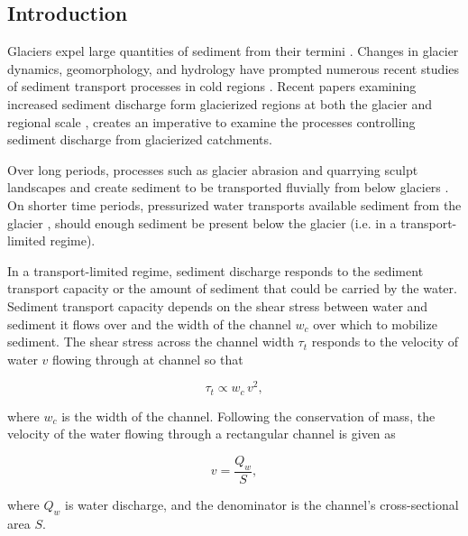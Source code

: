 \documentclass[11pt]{article}
\begin{document}
\begin{spacing}{1}
  \section{Introduction}

  Glaciers expel large quantities of sediment from their termini \citep{hallet1996}.
  Changes in glacier dynamics, geomorphology, and hydrology  have prompted numerous  recent studies of  sediment transport processes in cold regions \citep[e.g.][]{zhang2022}.
  Recent papers examining increased sediment discharge form glacierized regions at both the glacier and regional scale \citep{costa2017,delaney2020,li2022,vergara2022}, creates an imperative to examine the processes controlling sediment discharge from glacierized catchments. 
  
  Over long periods, processes such as glacier abrasion and quarrying sculpt landscapes and create sediment to be transported fluvially from below glaciers \citep[c.f.][]{hallet1979,iverson2012,ugelvig2018}. 
  On shorter time periods, pressurized water transports available sediment from the glacier \citep{walder1994,creyts2013,beaud2018b}, should enough sediment be present below the glacier (i.e. in a transport-limited regime).
  
  In a transport-limited regime, sediment discharge responds to the sediment transport capacity or the amount of sediment that could be carried by the water. Sediment transport capacity depends on the shear stress between water and sediment it flows  over \citep{shields1936,meyer1948,engelund1967} and the width of the channel $w_c$ over which to mobilize sediment. The shear stress  across the channel width $\tau_t$ responds to the velocity of water $v$ flowing through at channel so that 
  \begin{linenomath*}
    \begin{equation}
      \label{eq:tau_t}
      \tau_t \propto w_c\, v^2,
    \end{equation}
  \end{linenomath*}
  where $w_c$ is the width of the channel.
  Following the conservation of mass, the velocity of the water flowing through a rectangular channel is given as 
  \begin{linenomath*}
    \begin{equation}
      \label{eq:v}
      v = \frac{Q_w}{S},
    \end{equation}
  \end{linenomath*}
  where $Q_w$ is water discharge,  and the denominator is the channel's cross-sectional area $S$.


\end{spacing}
\end{document}
